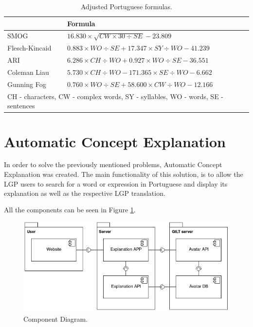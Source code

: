\documentclass[runningheads]{llncs}
\begin{document}
\begin{table}
    \caption{Adjusted Portuguese formulas.}
    \label{table:ptformulas}
    \begin{tabular}{l|l}
        \hline
        {} & {\bfseries Formula} \\
        \hline
        SMOG & \(16.830 \times \sqrt{CW \times 30 \div SE} - 23.809\)  \\
        \hline
        Flesch-Kincaid & \(0.883 \times WO \div SE + 17.347 \times SY \div WO - 41.239\) \\
        \hline
        ARI & \(6.286 \times CH \div WO + 0.927 \times WO \div SE - 36.551\) \\
        \hline
        Coleman Liau & \(5.730 \times CH \div WO - 171.365 \times SE \div WO - 6.662\) \\
        \hline
        Gunning Fog & \(0.760 \times WO \div SE + 58.600 \times CW \div WO - 12.166\) \\
        \hline
        \multicolumn{2}{l}{CH - characters, CW - complex words, SY - syllables, WO - words, SE - sentences}
    \end{tabular}
\end{table}

\section{Automatic Concept Explanation}

In order to solve the previously mentioned problems, Automatic Concept Explanation was created.
The main functionality of this solution, is to allow the LGP users to search for a word or expression in Portuguese and display its explanation as well as the respective LGP translation.

All the components can be seen in Figure \ref{fig1}.

\begin{figure}[ht]
\centering
\includegraphics[scale=0.4]{component_diagram.png}
\caption{Component Diagram.} \label{fig1}
\end{figure}
\end{document}
